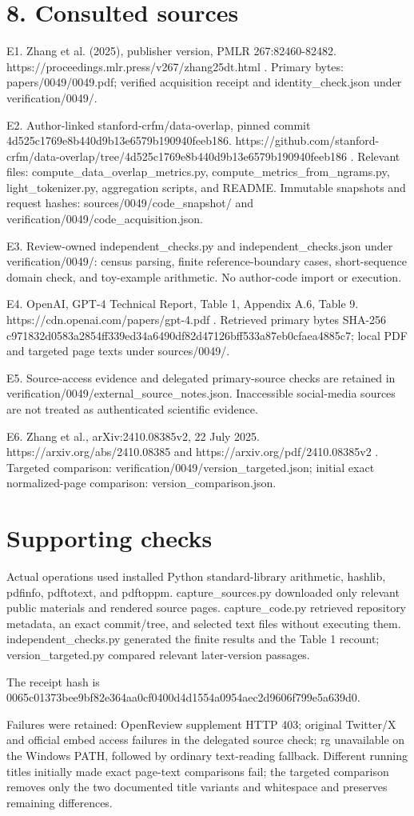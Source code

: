 \documentclass[10pt]{article}
\begin{document}
\section*{8. Consulted sources}
E1. Zhang et al. (2025), publisher version, PMLR 267:82460-82482. https://proceedings.mlr.press/v267/zhang25dt.html . Primary bytes: papers/0049/0049.pdf; verified acquisition receipt and identity\_check.json under verification/0049/.\par
E2. Author-linked stanford-crfm/data-overlap, pinned commit 4d525c1769e8b440d9b13e6579b190940feeb186. https://github.com/stanford-crfm/data-overlap/tree/4d525c1769e8b440d9b13e6579b190940feeb186 . Relevant files: compute\_data\_overlap\_metrics.py, compute\_metrics\_from\_ngrams.py, light\_tokenizer.py, aggregation scripts, and README. Immutable snapshots and request hashes: sources/0049/code\_snapshot/ and verification/0049/code\_acquisition.json.\par
E3. Review-owned independent\_checks.py and independent\_checks.json under verification/0049/: census parsing, finite reference-boundary cases, short-sequence domain check, and toy-example arithmetic. No author-code import or execution.\par
E4. OpenAI, GPT-4 Technical Report, Table 1, Appendix A.6, Table 9. https://cdn.openai.com/papers/gpt-4.pdf . Retrieved primary bytes SHA-256 c971832d0583a2854ff339ed34a6490df82d47126bff533a87eb0cfaea4885c7; local PDF and targeted page texts under sources/0049/.\par
E5. Source-access evidence and delegated primary-source checks are retained in verification/0049/external\_source\_notes.json. Inaccessible social-media sources are not treated as authenticated scientific evidence.\par
E6. Zhang et al., arXiv:2410.08385v2, 22 July 2025. https://arxiv.org/abs/2410.08385 and https://arxiv.org/pdf/2410.08385v2 . Targeted comparison: verification/0049/version\_targeted.json; initial exact normalized-page comparison: version\_comparison.json.\par
\section*{Supporting checks}
Actual operations used installed Python standard-library arithmetic, hashlib, pdfinfo, pdftotext, and pdftoppm. capture\_sources.py downloaded only relevant public materials and rendered source pages. capture\_code.py retrieved repository metadata, an exact commit/tree, and selected text files without executing them. independent\_checks.py generated the finite results and the Table 1 recount; version\_targeted.py compared relevant later-version passages.\par
The receipt hash is 0065c01373bee9bf82e364aa0cf0400d4d1554a0954aec2d9606f799e5a639d0.\par
Failures were retained: OpenReview supplement HTTP 403; original Twitter/X and official embed access failures in the delegated source check; rg unavailable on the Windows PATH, followed by ordinary text-reading fallback. Different running titles initially made exact page-text comparisons fail; the targeted comparison removes only the two documented title variants and whitespace and preserves remaining differences.\par
\end{document}
